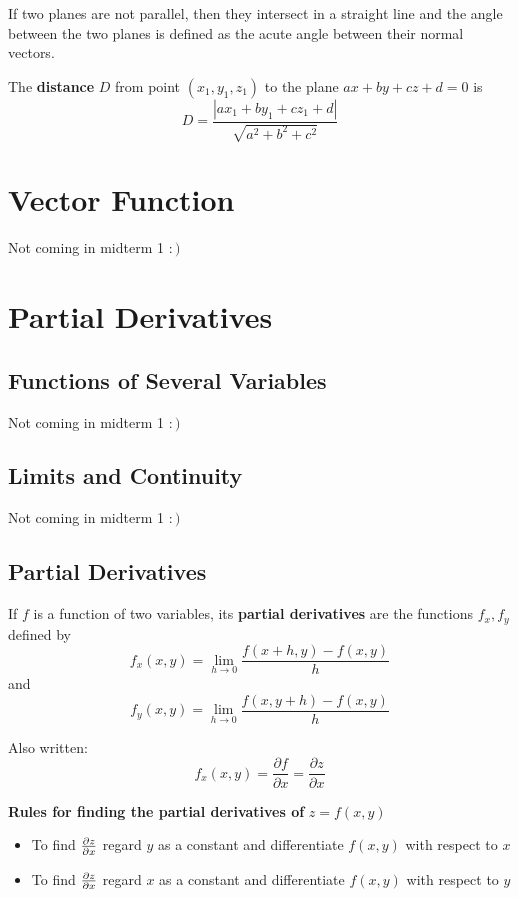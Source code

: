 \documentclass{report}
\begin{document}
If two planes are not parallel, then they intersect in a straight line and the angle between the two planes 
is defined as the acute angle between their normal vectors.

The \textbf{distance} $D$ from point $(x_1, y_1, z_1)$ to the plane 
$ax + by + cz + d = 0$ is 
\[
D = \frac{|a x_1 + b y_1 + c z_1 + d|}{\sqrt{a^2 + b^2 + c^2}}
\]

\chapter{Vector Function}

Not coming in midterm 1 $:)$

\chapter{Partial Derivatives}

\section{Functions of Several Variables}
Not coming in midterm 1 $:)$

\section{Limits and Continuity}
Not coming in midterm 1 $:)$

\section{Partial Derivatives}

If $f$ is a function of two variables, its \textbf{partial derivatives} are the functions 
$f_x, f_y$ defined by \[
f_x(x, y) = \lim_{h \to 0} \frac{f(x+h, y) - f(x, y)}{h}\]
and \[f_y(x, y) = \lim_{h \to 0} \frac{f(x, y+h) - f(x, y)}{h}\]

Also written: 
\[
f_x(x, y) = \frac{\partial f}{\partial x} = \frac{\partial z}{\partial x}
\]

\textbf{Rules for finding the partial derivatives of } $z = f(x, y)$
\begin{itemize}
    \item To find $\frac{\partial z}{\partial x}$ regard $y$ as a constant and differentiate $f(x, y)$ with respect to $x$
    \item To find $\frac{\partial z}{\partial x}$ regard $x$ as a constant and differentiate $f(x, y)$ with respect to $y$
\end{itemize}
\end{document}

